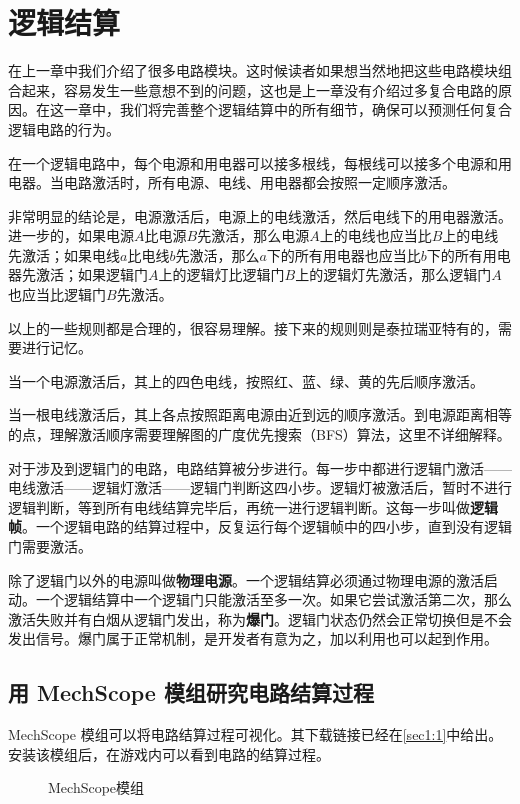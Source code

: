 \chapter{逻辑结算}\label{sec7}

在上一章中我们介绍了很多电路模块。这时候读者如果想当然地把这些电路模块组合起来，容易发生一些意想不到的问题，这也是上一章没有介绍过多复合电路的原因。在这一章中，我们将完善整个逻辑结算中的所有细节，确保可以预测任何复合逻辑电路的行为。

在一个逻辑电路中，每个电源和用电器可以接多根线，每根线可以接多个电源和用电器。当电路激活时，所有电源、电线、用电器都会按照一定顺序激活。

非常明显的结论是，电源激活后，电源上的电线激活，然后电线下的用电器激活。进一步的，如果电源$A$比电源$B$先激活，那么电源$A$上的电线也应当比$B$上的电线先激活；如果电线$a$比电线$b$先激活，那么$a$下的所有用电器也应当比$b$下的所有用电器先激活；如果逻辑门$A$上的逻辑灯比逻辑门$B$上的逻辑灯先激活，那么逻辑门$A$也应当比逻辑门$B$先激活。

以上的一些规则都是合理的，很容易理解。接下来的规则则是泰拉瑞亚特有的，需要进行记忆。

当一个电源激活后，其上的四色电线，按照红、蓝、绿、黄的先后顺序激活。

当一根电线激活后，其上各点按照距离电源由近到远的顺序激活。到电源距离相等的点，理解激活顺序需要理解图的广度优先搜索（BFS）算法，这里不详细解释。

对于涉及到逻辑门的电路，电路结算被分步进行。每一步中都进行逻辑门激活——电线激活——逻辑灯激活——逻辑门判断这四小步。逻辑灯被激活后，暂时不进行逻辑判断，等到所有电线结算完毕后，再统一进行逻辑判断。这每一步叫做\textbf{逻辑帧}。一个逻辑电路的结算过程中，反复运行每个逻辑帧中的四小步，直到没有逻辑门需要激活。

除了逻辑门以外的电源叫做\textbf{物理电源}。一个逻辑结算必须通过物理电源的激活启动。一个逻辑结算中一个逻辑门只能激活至多一次。如果它尝试激活第二次，那么激活失败并有白烟从逻辑门发出，称为\textbf{爆门}。逻辑门状态仍然会正常切换但是不会发出信号。爆门属于正常机制，是开发者有意为之，加以利用也可以起到作用。

\section{用 MechScope 模组研究电路结算过程}
MechScope 模组可以将电路结算过程可视化。其下载链接已经在\autoref{sec1:1}中给出。安装该模组后，在游戏内可以看到电路的结算过程。

\begin{figure}[!ht]
  \centering
  \caption{MechScope模组}\label{i273}
\end{figure}

